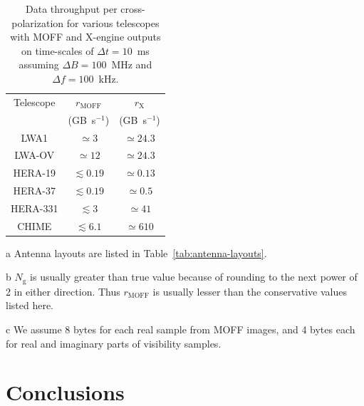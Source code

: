 \documentclass[a4paper,fleqn,usenatbib]{mnras}
\newcommand{\Ngrid}{N_\textrm{g}}
\begin{document}
\begin{table}
  \centering
  \caption{Data throughput per cross-polarization for various telescopes with MOFF and X-engine outputs on time-scales of $\Delta t=10$~ms assuming $\Delta B=100$~MHz and $\Delta f=100$~kHz.}
  \label{tab:data-rates}
  \begin{threeparttable}
  \begin{tabular}{ccc} 
    \hline
    Telescope\tnote{a} & $r_\textrm{MOFF}$\tnote{b} & $r_\textrm{X}$ \\
              & (GB~s$^{-1}$)\tnote{c} & (GB~s$^{-1}$)\tnote{c} \\
    \hline
    LWA1 & $\simeq 3$ & $\simeq 24.3$ \\
    LWA-OV & $\simeq 12$ & $\simeq 24.3$ \\
    HERA-19 & $\lesssim 0.19$ & $\simeq 0.13$ \\
    HERA-37 & $\lesssim 0.19$ & $\simeq 0.5$ \\
    HERA-331 & $\lesssim 3$ & $\simeq 41$ \\
    CHIME & $\lesssim 6.1$ & $\simeq 610$ \\
    \hline
  \end{tabular}
  \begin{tablenotes}
    \item[a] Antenna layouts are listed in Table~\ref{tab:antenna-layouts}.
    \item[b] $\Ngrid$ is usually greater than true value because of rounding to the next power of 2 in either direction. Thus $r_\textrm{MOFF}$ is usually lesser than the conservative values listed here.
    \item[c] We assume 8 bytes for each real sample from MOFF images, and 4 bytes each for real and imaginary parts of visibility samples.
  \end{tablenotes}
  \end{threeparttable}
\end{table}

\section{Conclusions}\label{sec:conclusions}
\end{document}

